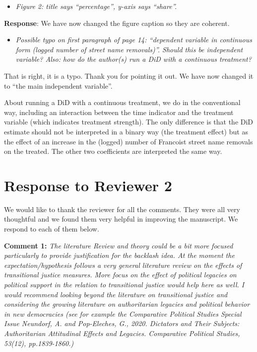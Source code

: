 \documentclass[12pt, a4paper, notitlepage]{article}
\begin{document}
\begin{itemize}
  \item \textit{Figure 2: title says “percentage”, y-axis says “share”.}
\end{itemize}

\textbf{Response}: We have now changed the figure caption so they are coherent.

\begin{itemize}
  \item \textit{Possible typo on first paragraph of page 14: “dependent variable in continuous form
  (logged number of street name removals)”. Should this be independent variable? Also: how do the author(s) run a DiD with a continuous treatment?}
\end{itemize}

That is right, it is a typo. Thank you for pointing it out. We have now changed it to ``the main independent variable''.

About running a DiD with a continuous treatment, we do in the conventional way, including an interaction between the time indicator and the treatment variable (which indicates treatment strength). The only difference is that the DiD estimate should not be interpreted in a binary way (the treatment effect) but as the effect of an increase in the (logged) number of Francoist street name removals on the treated. The other two coefficients are interpreted the same way.

\newpage
\section*{Response to Reviewer 2}

We would like to thank the reviewer for all the comments. They were all very thoughtful and we found them very helpful in improving the manuscript. We respond to each of them below.

\textbf{Comment 1:} \textit{The literature Review and theory could be a bit more focused particularly to provide justification for the backlash idea. At the moment the expectation/hypothesis follows a very general literature review on the effects of transitional justice measures. More focus on the effect of political legacies on political support in the relation to transitional justice would help here as well. I would recommend looking beyond the literature on transitional justice and considering the growing literature on authoritarian legacies and political behavior in new democracies (see for example the Comparative Political Studies Special Issue Neundorf, A. and Pop-Eleches, G., 2020. Dictators and Their Subjects: Authoritarian Attitudinal Effects and Legacies. Comparative Political Studies, 53(12), pp.1839-1860.)}
\end{document}
